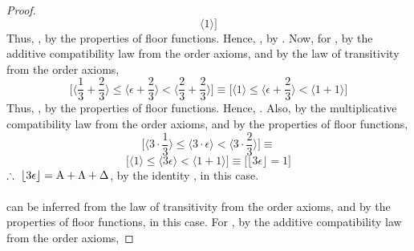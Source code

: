 \documentclass[preview]{standalone}
\begin{document}
\begin{proof}
\begin{equation*}
            \bigg \langle 1 \bigg \rangle
        \bigg]
    \end{equation*}
    Thus, , by the properties of floor functions.
    Hence, , by . 
    Now, for \bm{$\Delta$}, 
    by the additive compatibility law from the order axioms,
    and by the law of transitivity from the order axioms,
    \pagebreak
    \begin{equation*}
        \bigg[
            \bigg \langle \frac{1}{3} + \frac{2}{3} \bigg \rangle
                \leq 
            \bigg \langle \epsilon + \frac{2}{3} \bigg \rangle 
                < 
            \bigg \langle \frac{2}{3} + \frac{2}{3} \bigg \rangle
        \bigg]
            \equiv
        \bigg[
            \bigg \langle 1 \bigg \rangle
                \leq 
            \bigg \langle \epsilon + \frac{2}{3} \bigg \rangle 
                < 
            \bigg \langle 1 + 1 \bigg \rangle
        \bigg]
    \end{equation*}
    Thus, , by the properties of floor functions. 
    Hence, .
    Also, by the multiplicative compatibility law from the order axioms,
    and by the properties of floor functions,
    \begin{equation*}
        \bigg[
            \bigg \langle 3 \cdot \frac{1}{3} \bigg \rangle
                \leq
            \bigg \langle 3 \cdot \epsilon \bigg \rangle
                <
            \bigg \langle 3 \cdot \frac{2}{3} \bigg \rangle
        \bigg]
            \equiv
    \end{equation*}
    \begin{equation*}
        \bigg[
            \Big \langle 1 \Big \rangle
                \leq
            \Big \langle 3 \epsilon \Big \rangle
                <
            \Big \langle 1 + 1 \Big \rangle
        \bigg]
            \equiv
        \bigg[
            \big \lfloor 3 \epsilon \big \rfloor
                =
            1
        \bigg]
    \end{equation*}
    $\therefore \text{\space} \relax{
        \lfloor 3 \epsilon \rfloor
            =
        \mathrm{A} + \Lambda + \Delta
    }$, by the identity , in this case.
    \\ \\
     can be inferred from the law of transitivity from the order axioms,
    and by the properties of floor functions, in this case.
    For \bm{$\Lambda$},
    by the additive compatibility law from the order axioms,

\end{proof}
\end{document}

